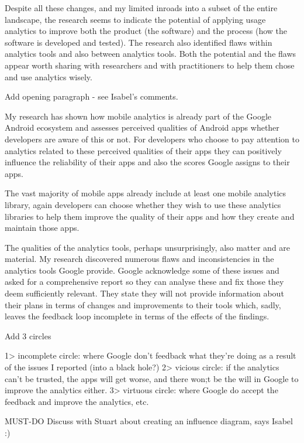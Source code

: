 Despite all these changes, and my limited inroads into a subset of the entire landscape, the research seems to indicate the potential of applying usage analytics to improve both the product (the software) and the process (how the software is developed and tested). The research also identified flaws within analytics tools and also between analytics tools. Both the potential and the flaws appear worth sharing with researchers and with practitioners to help them chose and use analytics wisely.



Add opening paragraph - see Isabel's comments. 

My research has shown how mobile analytics is already part of the Google Android ecosystem and assesses perceived qualities 
of Android apps whether developers are aware of this or not. For developers who choose to pay attention to analytics related to these perceived qualities of their apps they can positively influence the reliability of their apps and also the scores Google assigns to their apps. 

The vast majority of mobile apps already include at least one mobile analytics library, again developers can choose whether they wish to use these analytics libraries to help them improve the quality of their apps and how they create and maintain those apps. 

The qualities of the analytics tools, perhaps unsurprisingly, also matter and are material. My research discovered numerous flaws and inconsistencies in the analytics tools Google provide. Google acknowledge some of these issues and asked for a comprehensive report so they can analyse these and fix those they deem sufficiently relevant. They state they will not provide information about their plans in terms of changes and improvements to their tools which, sadly, leaves the feedback loop incomplete in terms of the effects of the findings.

Add 3 circles 

1> incomplete circle: where Google don't feedback what they're doing as a result of the issues I reported (into a black hole?)
2> vicious circle: if the analytics can't be trusted, the apps will get worse, and there won;t be the will in Google to improve the analytics either.
3> virtuous circle: where Google do accept the feedback and improve the analytics, etc. 

MUST-DO Discuss with Stuart about creating an influence diagram, says Isabel :) 

